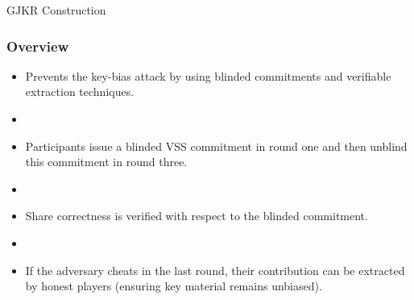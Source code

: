\documentclass[hyperref={pdfpagelabels=true},table,dvipsnames,14pt,aspectratio=169]{beamer}
\begin{document}
\begin{frame}
  \centering
{}
\end{frame}


\begin{frame}
  \huge
  \centering
  GJKR Construction
\end{frame}

\begin{frame}
  \frametitle{Overview}

  \begin{itemize}
    \item Prevents the key-bias attack by using blinded commitments and verifiable extraction techniques.
    \item[]
    \item<2-> Participants issue a blinded VSS commitment in round one and then unblind this commitment in round three.
    \item[]
    \item<3-> Share correctness is verified with respect to the blinded commitment.
    \item[]
    \item<4-> If the adversary cheats in the last round, their contribution can be extracted by honest players (ensuring key material remains unbiased).
  \end{itemize}
\end{frame}
\end{document}
